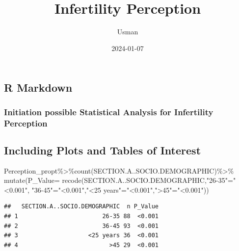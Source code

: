 \documentclass[
]{article}
\title{Infertility Perception}
\author{Usman}
\date{2024-01-07}
\newenvironment{Shaded}{\begin{snugshade}}{\end{snugshade}}
\newcommand{\AttributeTok}[1]{\textcolor[rgb]{0.77,0.63,0.00}{#1}}
\newcommand{\FunctionTok}[1]{\textcolor[rgb]{0.00,0.00,0.00}{#1}}
\newcommand{\NormalTok}[1]{#1}
\newcommand{\OtherTok}[1]{\textcolor[rgb]{0.56,0.35,0.01}{#1}}
\newcommand{\SpecialCharTok}[1]{\textcolor[rgb]{0.00,0.00,0.00}{#1}}
\newcommand{\StringTok}[1]{\textcolor[rgb]{0.31,0.60,0.02}{#1}}
\begin{document}
\maketitle

{
\setcounter{tocdepth}{2}
\tableofcontents
}
\hypertarget{r-markdown}{%
\subsection{R Markdown}\label{r-markdown}}

\hypertarget{initiation-possible-statistical-analysis-for-infertility-perception}{%
\subsubsection{\texorpdfstring{\textbf{Initiation possible Statistical
Analysis for Infertility
Perception}}{Initiation possible Statistical Analysis for Infertility Perception}}\label{initiation-possible-statistical-analysis-for-infertility-perception}}

\hypertarget{including-plots-and-tables-of-interest}{%
\subsection{\texorpdfstring{\textbf{Including Plots and Tables of
Interest}}{Including Plots and Tables of Interest}}\label{including-plots-and-tables-of-interest}}

\begin{Shaded}
\begin{Highlighting}[]
\NormalTok{Perception\_propt}\SpecialCharTok{\%\textgreater{}\%}\FunctionTok{count}\NormalTok{(SECTION.A..SOCIO.DEMOGRAPHIC)}\SpecialCharTok{\%\textgreater{}\%}
  \FunctionTok{mutate}\NormalTok{(}\AttributeTok{P\_Value=}
              \FunctionTok{recode}\NormalTok{(SECTION.A..SOCIO.DEMOGRAPHIC,}\StringTok{"26{-}35"}\OtherTok{=}\StringTok{"\textless{}0.001"}\NormalTok{,}
                     \StringTok{"36{-}45"}\OtherTok{=}\StringTok{"\textless{}0.001"}\NormalTok{,}\StringTok{"\textless{}25 years"}\OtherTok{=}\StringTok{"\textless{}0.001"}\NormalTok{,}\StringTok{"\textgreater{}45"}\OtherTok{=}\StringTok{"\textless{}0.001"}\NormalTok{))}
\end{Highlighting}
\end{Shaded}

\begin{verbatim}
##   SECTION.A..SOCIO.DEMOGRAPHIC  n P_Value
## 1                        26-35 88  <0.001
## 2                        36-45 93  <0.001
## 3                    <25 years 36  <0.001
## 4                          >45 29  <0.001
\end{verbatim}
\end{document}
